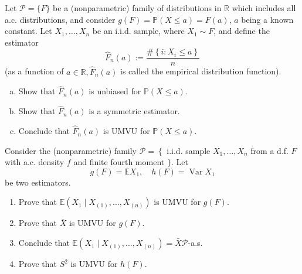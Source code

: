 \begin{ex}
    Let \(\mathcal{P}=\{F\}\) be a (nonparametric) family of distributions in \(\mathbb{R}\) which includes all a.c. distributions, and consider \(g(F)=\mathbb{P}(X \leq a)=F(a)\), \(a\) being a known constant. Let \(X_{1}, \ldots, X_{n}\) be an i.i.d. sample, where \(X_{1} \sim F\), and define the estimator
    \[
    \widehat{F}_{n}(a):=\frac{\#\left\{i: X_{i} \leq a\right\}}{n}
    \]
    (as a function of \(a \in \mathbb{R}, \widehat{F}_{n}(a)\) is called the empirical distribution function). 
    \begin{enumerate}[(a)]
        \item Show that \(\widehat{F}_{n}(a)\) is unbiased for \(\mathbb{P}(X \leq a)\). 
        \item Show that \(\widehat{F}_{n}(a)\) is a symmetric estimator. 
        \item Conclude that \(\widehat{F}_{n}(a)\) is UMVU for \(\mathbb{P}(X \leq a)\). 
    \end{enumerate}
\end{ex}


\begin{ex}
    Consider the (nonparametric) family
    \(\mathcal{P}=\left\{\right.\) i.i.d. sample \(X_{1}, \ldots, X_{n}\) from a d.f. \(F\) with a.c. density \(f\) and finite fourth moment \(\} .\)
    Let
    \[
    g(F)=\mathbb{E} X_{1}, \quad h(F)=\operatorname{Var} X_{1}
    \]
    be two estimators. 
    \begin{enumerate}
        \item Prove that \(\mathbb{E}\left(X_{1} \mid X_{(1)}, \ldots, X_{(n)}\right)\) is UMVU for \(g(F)\). 
        \item Prove that \(\bar{X}\) is UMVU for \(g(F)\). 
        \item Conclude that \(\mathbb{E}\left(X_{1} \mid X_{(1)}, \ldots, X_{(n)}\right)=\bar{X} \mathcal{P}\)-a.s. 
        \item Prove that \(S^{2}\) is UMVU for \(h(F)\). 
    \end{enumerate}
\end{ex}


